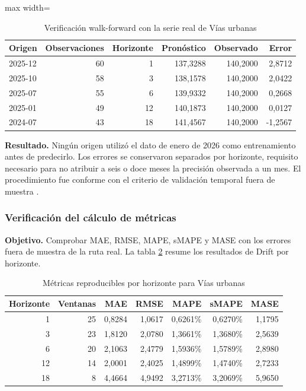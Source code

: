 \documentclass[12pt,letterpaper]{article}
\providecommand{\parencite}{\citep}
\begin{document}
\begin{table}[H]
\centering
\caption{Verificación walk-forward con la serie real de Vías urbanas}
\label{tab:prueba_walkforward_real}
\vspace{\baselineskip}
\scriptsize
\begin{adjustbox}{max width=\textwidth}
\begin{tabular}{lrrrrr}
\toprule
\textbf{Origen} & \textbf{Observaciones} & \textbf{Horizonte} & \textbf{Pronóstico} & \textbf{Observado} & \textbf{Error} \\
\midrule
2025-12 & 60 & 1 & 137,3288 & 140,2000 & 2,8712 \\
2025-10 & 58 & 3 & 138,1578 & 140,2000 & 2,0422 \\
2025-07 & 55 & 6 & 139,9332 & 140,2000 & 0,2668 \\
2025-01 & 49 & 12 & 140,1873 & 140,2000 & 0,0127 \\
2024-07 & 43 & 18 & 141,4567 & 140,2000 & -1,2567 \\
\bottomrule
\end{tabular}
\end{adjustbox}
\end{table}

\textbf{Resultado.} Ningún origen utilizó el dato de enero de 2026 como entrenamiento antes de predecirlo. Los errores se conservaron separados por horizonte, requisito necesario para no atribuir a seis o doce meses la precisión observada a un mes. El procedimiento fue conforme con el criterio de validación temporal fuera de muestra \parencite{tashman2000}.

\subsubsection{Verificación del cálculo de métricas}

\textbf{Objetivo.} Comprobar MAE, RMSE, MAPE, sMAPE y MASE con los errores fuera de muestra de la ruta real. La tabla \ref{tab:prueba_metricas_reales} resume los resultados de Drift por horizonte.

\begin{table}[H]
\centering
\caption{Métricas reproducibles por horizonte para Vías urbanas}
\label{tab:prueba_metricas_reales}
\vspace{\baselineskip}
\scriptsize
\begin{tabular}{rrrrrrr}
\toprule
\textbf{Horizonte} & \textbf{Ventanas} & \textbf{MAE} & \textbf{RMSE} & \textbf{MAPE} & \textbf{sMAPE} & \textbf{MASE} \\
\midrule
1 & 25 & 0,8284 & 1,0617 & 0,6261\% & 0,6270\% & 1,1795 \\
3 & 23 & 1,8120 & 2,0780 & 1,3661\% & 1,3680\% & 2,5639 \\
6 & 20 & 2,1063 & 2,4779 & 1,5936\% & 1,5789\% & 2,8980 \\
12 & 14 & 2,0001 & 2,4025 & 1,4899\% & 1,4740\% & 2,7233 \\
18 & 8 & 4,4664 & 4,9492 & 3,2713\% & 3,2069\% & 5,9650 \\
\bottomrule
\end{tabular}
\end{table}
\end{document}
